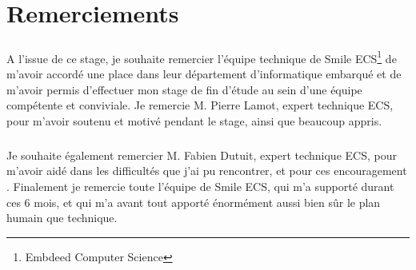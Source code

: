 \chapter*{Remerciements}

 \paragraph{} A l'issue de ce stage, je souhaite remercier l'équipe technique de Smile ECS\footnote{Embdeed Computer Science} de m'avoir accordé une place dans leur département d'informatique embarqué et de m'avoir permis d'effectuer mon stage de fin d'étude au sein d'une équipe compétente et conviviale. Je remercie M. Pierre Lamot, expert technique ECS, pour m'avoir soutenu et motivé pendant le stage, ainsi que beaucoup appris.
 \paragraph{}  Je souhaite également remercier M. Fabien Dutuit, expert technique ECS, pour m'avoir aidé dans les difficultés que j'ai pu rencontrer, et pour ces encouragement . Finalement je remercie toute l'équipe de Smile ECS, qui m'a supporté durant ces 6 mois, et qui m'a avant tout apporté énormément aussi bien sûr le plan humain que technique.
